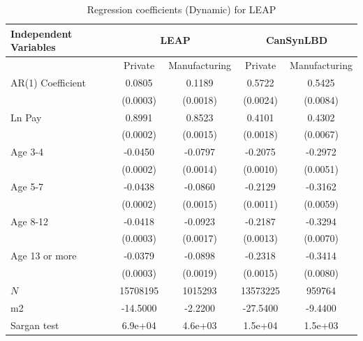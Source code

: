 \begin{table}[H]
  \centering
\begin{threeparttable}
 \caption{Regression coefficients (Dynamic) for LEAP} \label{tab:Dynamic - GMM_can} \medskip
\renewcommand{\arraystretch}{1}
\begin{tabular}{l|c c| c c}
\toprule
\textbf{Independent Variables}&\multicolumn{2}{c|}{\textbf{LEAP}} &  \multicolumn{2}{c}{\textbf{CanSynLBD}}\\
\midrule
&\multicolumn{1}{c}{Private}&\multicolumn{1}{c}{Manufacturing}&\multicolumn{1}{c}{Private}&\multicolumn{1}{c}{Manufacturing}\\
\hline
AR(1) Coefficient&   0.0805\sym{***}&   0.1189\sym{***}&   0.5722\sym{***}&   0.5425\sym{***}\\
          & (0.0003)         & (0.0018)         & (0.0024)         & (0.0084)         \\
[1em]
Ln Pay    &   0.8991\sym{***}&   0.8523\sym{***}&   0.4101\sym{***}&   0.4302\sym{***}\\
          & (0.0002)         & (0.0015)         & (0.0018)         & (0.0067)         \\
[1em]
Age 3-4   &  -0.0450\sym{***}&  -0.0797\sym{***}&  -0.2075\sym{***}&  -0.2972\sym{***}\\
          & (0.0002)         & (0.0014)         & (0.0010)         & (0.0051)         \\
[1em]
Age 5-7   &  -0.0438\sym{***}&  -0.0860\sym{***}&  -0.2129\sym{***}&  -0.3162\sym{***}\\
          & (0.0002)         & (0.0015)         & (0.0011)         & (0.0059)         \\
[1em]
Age 8-12  &  -0.0418\sym{***}&  -0.0923\sym{***}&  -0.2187\sym{***}&  -0.3294\sym{***}\\
          & (0.0003)         & (0.0017)         & (0.0013)         & (0.0070)         \\
[1em]
Age 13 or more&  -0.0379\sym{***}&  -0.0898\sym{***}&  -0.2318\sym{***}&  -0.3414\sym{***}\\
          & (0.0003)         & (0.0019)         & (0.0015)         & (0.0080)         \\
\hline
\(N\)     & 15708195         &  1015293         & 13573225         &   959764         \\
m2        & -14.5000         &  -2.2200         & -27.5400         &  -9.4400         \\
Sargan test&  6.9e+04         &  4.6e+03         &  1.5e+04         &  1.5e+03         \\

\end{tabular}
\end{threeparttable}
\end{table}
